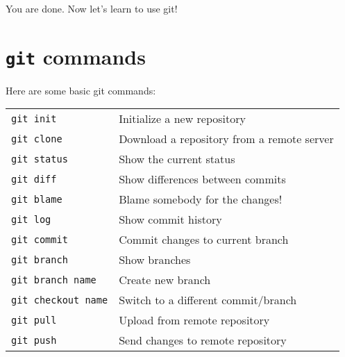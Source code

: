   	  
You are done. Now let's learn to use git! 

\section{{\tt git} commands}
  
Here are some basic git commands:
 
\begin{tabular}{p{} p{}} 
	{\tt git init} & Initialize a new repository\\
	{\tt git clone} & Download a repository from a remote server\\
	{\tt git status} & Show the current status\\
	{\tt git diff} & Show differences between commits\\
	{\tt git blame} & Blame somebody for the changes!\\
	{\tt git log} & Show commit history\\
	{\tt git commit} & Commit changes to current branch\\
	{\tt git branch} & Show branches\\
	{\tt git branch name} & Create new branch\\
	{\tt git checkout name} & Switch to a different commit/branch\\
	{\tt git pull} & Upload from remote repository\\
	{\tt git push} & Send changes to remote repository\\
\end{tabular}

